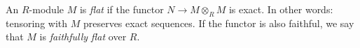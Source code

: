 \begin{definition}
   An $R$-module $M$ is \textit{flat} if the functor $N \to M \otimes_R M$ is exact. In other words: tensoring with $M$ preserves exact sequences. If the functor is also faithful, we say that $M$ is \textit{faithfully flat} over $R$.
\end{definition}

%
%